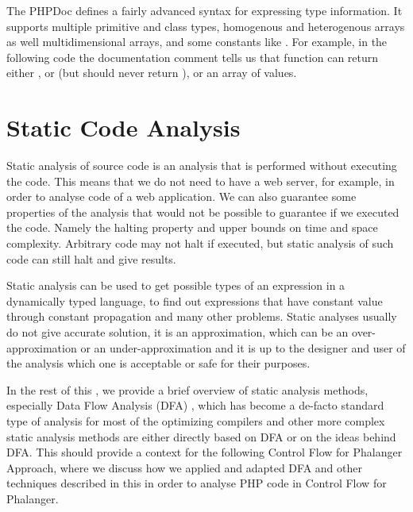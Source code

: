     The PHPDoc defines a fairly advanced syntax for expressing 
    type information. It supports multiple 
    primitive and class types, homogenous and heterogenous arrays as well 
    multidimensional arrays, and some constants like .
    For example, in the following code the documentation 
    comment tells us that function  can return 
    either , or  (but should never 
    return ), or an array of  values.
    
    
    \section{Static Code Analysis}       
    \label{statanal}
        Static analysis of source code is an analysis that is performed without 
        executing the code. This means that we do not need to have a
        web server, for example, in order to analyse code of a web application. 
        We can also guarantee some properties of the analysis that would not 
        be possible to guarantee if we executed the code. Namely the halting property and 
        upper bounds on time and space complexity. Arbitrary code may not 
        halt if executed, but static analysis of such code can still halt 
        and give results.
        
        Static analysis can be used to get possible types of an expression in 
        a dynamically typed language, to find out expressions that have constant 
        value through constant propagation and many other problems. 
        Static analyses usually do not give accurate solution, it is an approximation, 
        which can be an over-approximation or an under-approximation and it is up 
        to the designer and user of the analysis which one is acceptable or safe for 
        their purposes.
        
        In the rest of this \wsection{}, we provide a brief overview of 
        static analysis methods, especially 
        Data Flow Analysis (DFA) \cite{aho1985compilers}\cite{nielson1999principles},
        which has become a de-facto standard type of analysis for most of 
        the optimizing compilers and other more complex static analysis methods 
        are either directly based on DFA or on the ideas behind DFA.
        This should provide a context for the following \wsection{} 
        Control Flow for Phalanger Approach, where we discuss how we 
        applied and adapted DFA and other techniques described 
        in this \wsection{} in order to analyse PHP code in 
        Control Flow for Phalanger.
        

